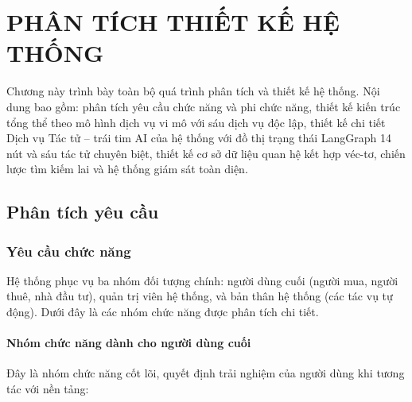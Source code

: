 \chapter{PHÂN TÍCH THIẾT KẾ HỆ THỐNG}

Chương này trình bày toàn bộ quá trình phân tích và thiết kế hệ thống. Nội dung bao gồm: phân tích yêu cầu chức năng và phi chức năng, thiết kế kiến trúc tổng thể theo mô hình dịch vụ vi mô với sáu dịch vụ độc lập, thiết kế chi tiết Dịch vụ Tác tử -- trái tim AI của hệ thống với đồ thị trạng thái LangGraph 14 nút và sáu tác tử chuyên biệt, thiết kế cơ sở dữ liệu quan hệ kết hợp véc-tơ, chiến lược tìm kiếm lai và hệ thống giám sát toàn diện.

\section{Phân tích yêu cầu}

\subsection{Yêu cầu chức năng}

Hệ thống phục vụ ba nhóm đối tượng chính: người dùng cuối (người mua, người thuê, nhà đầu tư), quản trị viên hệ thống, và bản thân hệ thống (các tác vụ tự động). Dưới đây là các nhóm chức năng được phân tích chi tiết.

\subsubsection{Nhóm chức năng dành cho người dùng cuối}

Đây là nhóm chức năng cốt lõi, quyết định trải nghiệm của người dùng khi tương tác với nền tảng:

